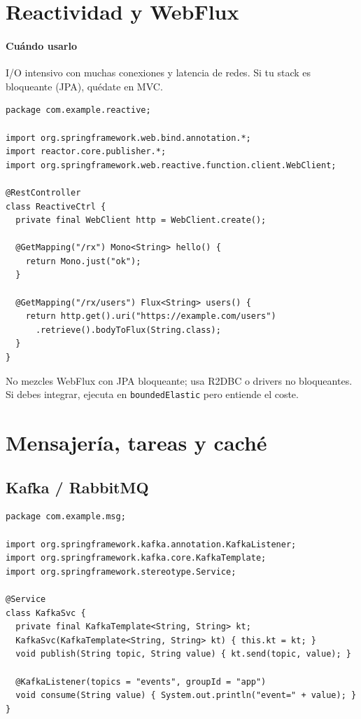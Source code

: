 \documentclass[11pt,a4paper]{article}
\begin{document}
\section{Reactividad y WebFlux}
\paragraph{Cuándo usarlo}
I/O intensivo con muchas conexiones y latencia de redes. Si tu stack es bloqueante (JPA), quédate en MVC.

\begin{lstlisting}[style=javastyle, caption={Controlador reactivo y WebClient}]
package com.example.reactive;

import org.springframework.web.bind.annotation.*;
import reactor.core.publisher.*;
import org.springframework.web.reactive.function.client.WebClient;

@RestController
class ReactiveCtrl {
  private final WebClient http = WebClient.create();

  @GetMapping("/rx") Mono<String> hello() {
    return Mono.just("ok");
  }

  @GetMapping("/rx/users") Flux<String> users() {
    return http.get().uri("https://example.com/users")
      .retrieve().bodyToFlux(String.class);
  }
}
\end{lstlisting}

\begin{warnbox}
No mezcles WebFlux con JPA bloqueante; usa R2DBC o drivers no bloqueantes. Si debes integrar, ejecuta en \texttt{boundedElastic} pero entiende el coste.
\end{warnbox}

\section{Mensajería, tareas y caché}
\subsection{Kafka / RabbitMQ}
\begin{lstlisting}[style=javastyle, caption={Productor/consumidor Kafka}]
package com.example.msg;

import org.springframework.kafka.annotation.KafkaListener;
import org.springframework.kafka.core.KafkaTemplate;
import org.springframework.stereotype.Service;

@Service
class KafkaSvc {
  private final KafkaTemplate<String, String> kt;
  KafkaSvc(KafkaTemplate<String, String> kt) { this.kt = kt; }
  void publish(String topic, String value) { kt.send(topic, value); }

  @KafkaListener(topics = "events", groupId = "app")
  void consume(String value) { System.out.println("event=" + value); }
}
\end{lstlisting}
\end{document}
